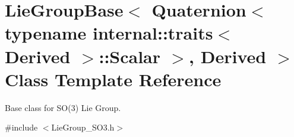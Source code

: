 \hypertarget{class_lie_group_base_3_01_quaternion_3_01typename_01internal_1_1traits_3_01_derived_01_4_1_1_scalar_01_4_00_01_derived_01_4}{}\section{Lie\+Group\+Base$<$ Quaternion$<$ typename internal\+:\+:traits$<$ Derived $>$\+:\+:Scalar $>$, Derived $>$ Class Template Reference}
\label{class_lie_group_base_3_01_quaternion_3_01typename_01internal_1_1traits_3_01_derived_01_4_1_1_scalar_01_4_00_01_derived_01_4}


Base class for S\+O(3) Lie Group.  




{\ttfamily \#include $<$Lie\+Group\+\_\+\+S\+O3.\+h$>$}

